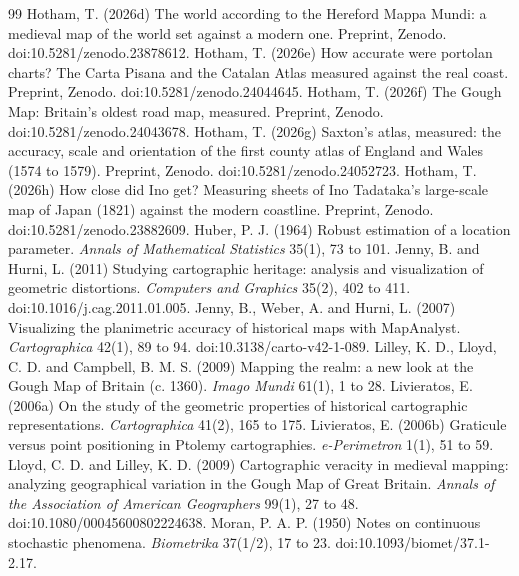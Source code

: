 \documentclass[11pt,a4paper]{article}
\begin{document}
\begin{thebibliography}{99}
 Hotham, T. (2026d) The world according to the Hereford Mappa Mundi: a medieval map of the world set against a modern one. Preprint, Zenodo. doi:10.5281/zenodo.23878612.
 Hotham, T. (2026e) How accurate were portolan charts? The Carta Pisana and the Catalan Atlas measured against the real coast. Preprint, Zenodo. doi:10.5281/zenodo.24044645.
 Hotham, T. (2026f) The Gough Map: Britain's oldest road map, measured. Preprint, Zenodo. doi:10.5281/zenodo.24043678.
 Hotham, T. (2026g) Saxton's atlas, measured: the accuracy, scale and orientation of the first county atlas of England and Wales (1574 to 1579). Preprint, Zenodo. doi:10.5281/zenodo.24052723.
 Hotham, T. (2026h) How close did Ino get? Measuring sheets of Ino Tadataka's large-scale map of Japan (1821) against the modern coastline. Preprint, Zenodo. doi:10.5281/zenodo.23882609.
 Huber, P. J. (1964) Robust estimation of a location parameter. \textit{Annals of Mathematical Statistics} 35(1), 73 to 101.
 Jenny, B. and Hurni, L. (2011) Studying cartographic heritage: analysis and visualization of geometric distortions. \textit{Computers and Graphics} 35(2), 402 to 411. doi:10.1016/j.cag.2011.01.005.
 Jenny, B., Weber, A. and Hurni, L. (2007) Visualizing the planimetric accuracy of historical maps with MapAnalyst. \textit{Cartographica} 42(1), 89 to 94. doi:10.3138/carto-v42-1-089.
 Lilley, K. D., Lloyd, C. D. and Campbell, B. M. S. (2009) Mapping the realm: a new look at the Gough Map of Britain (c. 1360). \textit{Imago Mundi} 61(1), 1 to 28.
 Livieratos, E. (2006a) On the study of the geometric properties of historical cartographic representations. \textit{Cartographica} 41(2), 165 to 175.
 Livieratos, E. (2006b) Graticule versus point positioning in Ptolemy cartographies. \textit{e-Perimetron} 1(1), 51 to 59.
 Lloyd, C. D. and Lilley, K. D. (2009) Cartographic veracity in medieval mapping: analyzing geographical variation in the Gough Map of Great Britain. \textit{Annals of the Association of American Geographers} 99(1), 27 to 48. doi:10.1080/00045600802224638.
 Moran, P. A. P. (1950) Notes on continuous stochastic phenomena. \textit{Biometrika} 37(1/2), 17 to 23. doi:10.1093/biomet/37.1-2.17.

\end{thebibliography}
\end{document}

